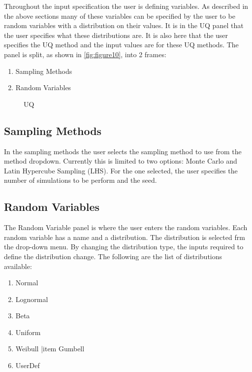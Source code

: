 Throughout the input specification the user is defining variables. As described in the above sections many of these variables can be specified by the user to be random variables with a distribution on their values. It is in the UQ panel that the user specifies what these distributions are. 
It is also here that the user specifies the UQ method and the input values are for these UQ methods. 
The panel is split,  as shown in \autoref{fig:figure10}, into 2 frames:
 \begin{enumerate}
\item Sampling Methods 
\item Random Variables
\end{enumerate}

\begin{figure}[!htbp]
  \caption{UQ}
  \label{fig:figure10}
\end{figure}


\subsection{Sampling Methods}
In the sampling methods the user selects the sampling method to use from the method dropdown. Currently this is limited to two options: 
Monte Carlo and Latin Hypercube Sampling (LHS). For the one selected, the user specifies the number of simulations to be perform and the seed.

\subsection{Random Variables}
The Random Variable panel is where the user enters the random variables. Each random variable has a name and a distribution. The distribution is selected frm the drop-down menu. By changing the distribution type, the inputs required to define the distribution change. The following are the list of distributions available:
\begin{enumerate}
\item Normal
\item Lognormal
\item Beta
\item Uniform
\item Weibull
|item Gumbell
\item UserDef
\end{enumerate} 

